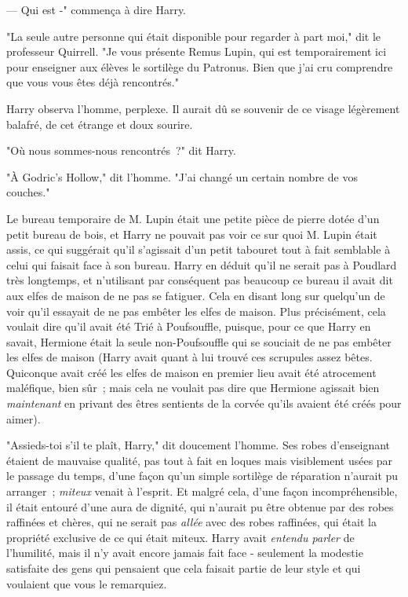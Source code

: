 --- Qui est -" commença à dire Harry.

"La seule autre personne qui était disponible pour regarder à part moi," dit le professeur Quirrell. "Je vous présente Remus Lupin, qui est temporairement ici pour enseigner aux élèves le sortilège du Patronus. Bien que j'ai cru comprendre que vous vous êtes déjà rencontrés."

Harry observa l'homme, perplexe. Il aurait dû se souvenir de ce visage légèrement balafré, de cet étrange et doux sourire.

"Où nous sommes-nous rencontrés~?" dit Harry.

"À Godric's Hollow," dit l'homme. "J'ai changé un certain nombre de vos couches."

\later

Le bureau temporaire de M. Lupin était une petite pièce de pierre dotée d'un petit bureau de bois, et Harry ne pouvait pas voir ce sur quoi M. Lupin était assis, ce qui suggérait qu'il s'agissait d'un petit tabouret tout à fait semblable à celui qui faisait face à son bureau. Harry en déduit qu'il ne serait pas à Poudlard très longtemps, et n'utilisant par conséquent pas beaucoup ce bureau il avait dit aux elfes de maison de ne pas se fatiguer. Cela en disant long sur quelqu'un de voir qu'il essayait de ne pas embêter les elfes de maison. Plus précisément, cela voulait dire qu'il avait été Trié à Poufsouffle, puisque, pour ce que Harry en savait, Hermione était la seule non-Poufsouffle qui se souciait de ne pas embêter les elfes de maison (Harry avait quant à lui trouvé ces scrupules assez bêtes. Quiconque avait créé les elfes de maison en premier lieu avait été atrocement maléfique, bien sûr~; mais cela ne voulait pas dire que Hermione agissait bien \emph{maintenant} en privant des êtres sentients de la corvée qu'ils avaient été créés pour aimer).

"Assieds-toi s'il te plaît, Harry," dit doucement l'homme. Ses robes d'enseignant étaient de mauvaise qualité, pas tout à fait en loques mais visiblement usées par le passage du temps, d'une façon qu'un simple sortilège de réparation n'aurait pu arranger~; \emph{miteux} venait à l'esprit. Et malgré cela, d'une façon incompréhensible, il était entouré d'une aura de dignité, qui n'aurait pu être obtenue par des robes raffinées et chères, qui ne serait pas \emph{allée} avec des robes raffinées, qui était la propriété exclusive de ce qui était miteux. Harry avait \emph{entendu parler} de l'humilité, mais il n'y avait encore jamais fait face - seulement la modestie satisfaite des gens qui pensaient que cela faisait partie de leur style et qui voulaient que vous le remarquiez.

